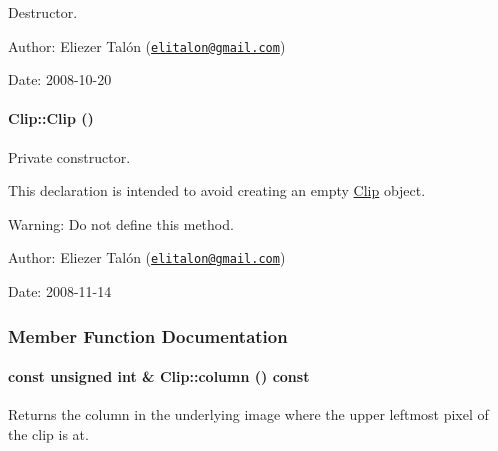 Destructor. 

\begin{Desc}
\item[Author:]Eliezer Talón (\href{mailto:elitalon@gmail.com}{\tt elitalon@gmail.com}) \end{Desc}
\begin{Desc}
\item[Date:]2008-10-20 \end{Desc}
\hypertarget{class_clip_313d69fd73a96253cb578d09d20dcbac}{
\paragraph[{Clip}]{\setlength{\rightskip}{0pt plus 5cm}Clip::Clip ()}\hfill}
\label{class_clip_313d69fd73a96253cb578d09d20dcbac}


Private constructor. 

This declaration is intended to avoid creating an empty \hyperlink{class_clip}{Clip} object.

\begin{Desc}
\item[Warning:]Do not define this method.\end{Desc}
\begin{Desc}
\item[Author:]Eliezer Talón (\href{mailto:elitalon@gmail.com}{\tt elitalon@gmail.com}) \end{Desc}
\begin{Desc}
\item[Date:]2008-11-14 \end{Desc}


\subsubsection{Member Function Documentation}
\hypertarget{class_clip_06a34378fa0f23425d10bb04e9972a26}{
\paragraph[{column}]{\setlength{\rightskip}{0pt plus 5cm}const unsigned int \& Clip::column () const}\hfill}
\label{class_clip_06a34378fa0f23425d10bb04e9972a26}


Returns the column in the underlying image where the upper leftmost pixel of the clip is at. 

